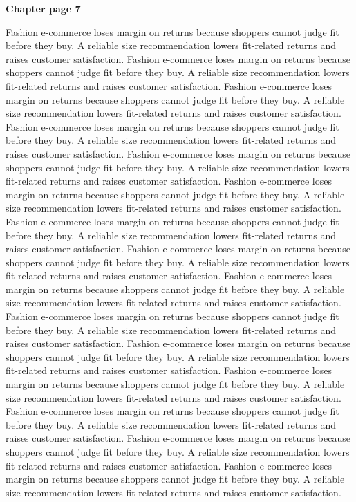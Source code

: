 \documentclass[a4paper,11pt]{article}
\begin{document}
{\headfont\bfseries\Large Chapter page 7}\par\medskip
Fashion e-commerce loses margin on returns because shoppers cannot judge fit before they buy. A reliable size recommendation lowers fit-related returns and raises customer satisfaction. Fashion e-commerce loses margin on returns because shoppers cannot judge fit before they buy. A reliable size recommendation lowers fit-related returns and raises customer satisfaction. Fashion e-commerce loses margin on returns because shoppers cannot judge fit before they buy. A reliable size recommendation lowers fit-related returns and raises customer satisfaction. Fashion e-commerce loses margin on returns because shoppers cannot judge fit before they buy. A reliable size recommendation lowers fit-related returns and raises customer satisfaction. Fashion e-commerce loses margin on returns because shoppers cannot judge fit before they buy. A reliable size recommendation lowers fit-related returns and raises customer satisfaction. 
Fashion e-commerce loses margin on returns because shoppers cannot judge fit before they buy. A reliable size recommendation lowers fit-related returns and raises customer satisfaction. Fashion e-commerce loses margin on returns because shoppers cannot judge fit before they buy. A reliable size recommendation lowers fit-related returns and raises customer satisfaction. Fashion e-commerce loses margin on returns because shoppers cannot judge fit before they buy. A reliable size recommendation lowers fit-related returns and raises customer satisfaction. Fashion e-commerce loses margin on returns because shoppers cannot judge fit before they buy. A reliable size recommendation lowers fit-related returns and raises customer satisfaction. Fashion e-commerce loses margin on returns because shoppers cannot judge fit before they buy. A reliable size recommendation lowers fit-related returns and raises customer satisfaction. 
Fashion e-commerce loses margin on returns because shoppers cannot judge fit before they buy. A reliable size recommendation lowers fit-related returns and raises customer satisfaction. Fashion e-commerce loses margin on returns because shoppers cannot judge fit before they buy. A reliable size recommendation lowers fit-related returns and raises customer satisfaction. Fashion e-commerce loses margin on returns because shoppers cannot judge fit before they buy. A reliable size recommendation lowers fit-related returns and raises customer satisfaction. Fashion e-commerce loses margin on returns because shoppers cannot judge fit before they buy. A reliable size recommendation lowers fit-related returns and raises customer satisfaction. Fashion e-commerce loses margin on returns because shoppers cannot judge fit before they buy. A reliable size recommendation lowers fit-related returns and raises customer satisfaction. \newpage
\end{document}
